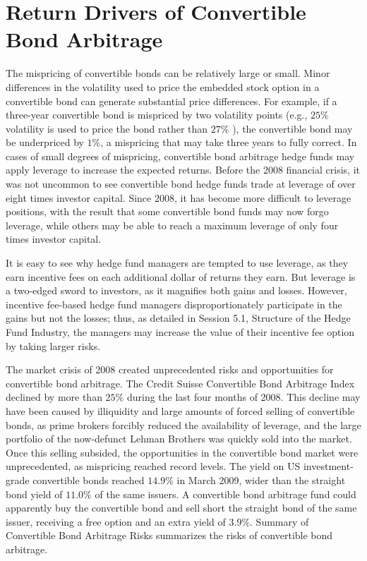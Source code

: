\documentclass[11pt]{article}
\begin{document}
\section*{Return Drivers of Convertible Bond Arbitrage}
The mispricing of convertible bonds can be relatively large or small. Minor differences in the volatility used to price the embedded stock option in a convertible bond can generate substantial price differences. For example, if a three-year convertible bond is mispriced by two volatility points (e.g., $25 \%$ volatility is used to price the bond rather than $27 \%$ ), the convertible bond may be underpriced by $1 \%$, a mispricing that may take three years to fully correct. In cases of small degrees of mispricing, convertible bond arbitrage hedge funds may apply leverage to increase the expected returns. Before the 2008 financial crisis, it was not uncommon to see convertible bond hedge funds trade at leverage of over eight times investor capital. Since 2008, it has become more difficult to leverage positions, with the result that some convertible bond funds may now forgo leverage, while others may be able to reach a maximum leverage of only four times investor capital.

It is easy to see why hedge fund managers are tempted to use leverage, as they earn incentive fees on each additional dollar of returns they earn. But leverage is a two-edged sword to investors, as it magnifies both gains and losses. However, incentive fee-based hedge fund managers disproportionately participate in the gains but not the losses; thus, as detailed in Session 5.1, Structure of the Hedge Fund Industry, the managers may increase the value of their incentive fee option by taking larger risks.

The market crisis of 2008 created unprecedented risks and opportunities for convertible bond arbitrage. The Credit Suisse Convertible Bond Arbitrage Index declined by more than $25 \%$ during the last four months of 2008. This decline may have been caused by illiquidity and large amounts of forced selling of convertible bonds, as prime brokers forcibly reduced the availability of leverage, and the large portfolio of the now-defunct Lehman Brothers was quickly sold into the market. Once this selling subsided, the opportunities in the convertible bond market were unprecedented, as mispricing reached record levels. The yield on US investment-grade convertible bonds reached $14.9 \%$ in March 2009, wider than the straight bond yield of $11.0 \%$ of the same issuers. A convertible bond arbitrage fund could apparently buy the convertible bond and sell short the straight bond of the same issuer, receiving a free option and an extra yield of $3.9 \%$. Summary of Convertible Bond Arbitrage Risks summarizes the risks of convertible bond arbitrage.
\end{document}
